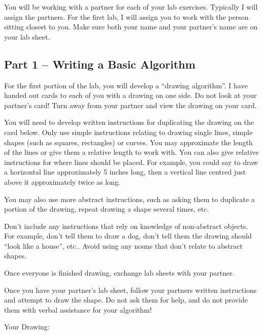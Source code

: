 You will be working with a partner for each of your lab exercises. Typically I 
will assign the partners. For the first lab, I will assign you to work with 
the person sitting closest to you. Make sure both your name and your partner's
name are on your lab sheet. 

\subsection{Part 1 -- Writing a Basic Algorithm}

For the first portion of the lab, you will develop a ``drawing algorithm''. I have
handed out cards to each of you with a drawing on one side. Do not look at your 
partner's card! Turn away from your partner and view the drawing on your card. 

\begin{exer}
You will need to develop written instructions for duplicating the drawing on 
the card below. Only use simple instructions relating to drawing single lines,
simple shapes (such as squares, rectangles) or curves. You may approximate the
length of the lines or give them a relative length to work with. You can also 
give relative instructions for where lines should be placed. For example, you 
could say to draw a horizontal line approximately 5 inches long, then a vertical 
line centred just above it approximately twice as long.

You may also use more abstract instructions, such as asking them to duplicate a 
portion of the drawing, repeat drawing a shape several times, etc. 

Don't include any instructions that rely on knowledge of non-abstract objects.
For example, don't tell them to draw a dog, don't tell them the drawing should 
``look like a house'', etc.. Avoid using any nouns that don't relate to abstract
shapes. 

\evallineten

\end{exer}

Once everyone is finished drawing, exchange lab sheets with your partner. 
\newpage
\begin{exer}
Once you have your partner's lab sheet, follow your partners written instructions and
attempt to draw the shape. Do not ask them for help, and do not provide them 
with verbal assistance for your algorithm!

Your Drawing:\\[4in]
\end{exer}

